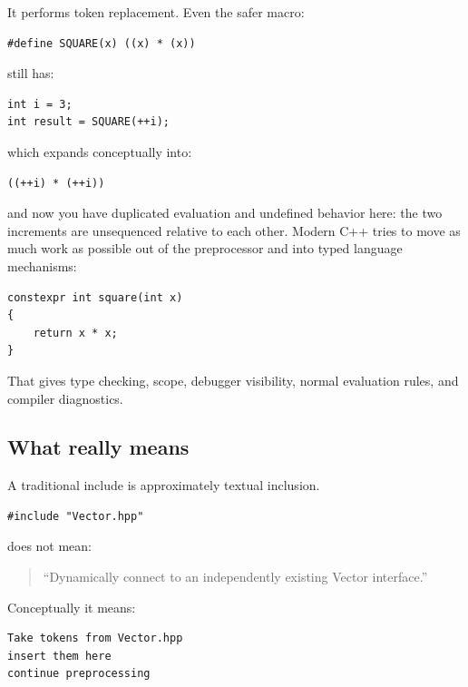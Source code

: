 It performs token replacement. Even the safer macro:

\begin{verbatim}
#define SQUARE(x) ((x) * (x))
\end{verbatim}

still has:

\begin{verbatim}
int i = 3;
int result = SQUARE(++i);
\end{verbatim}

which expands conceptually into:

\begin{verbatim}
((++i) * (++i))
\end{verbatim}

and now you have duplicated evaluation and undefined behavior here: the two increments are unsequenced relative to each other. Modern C++ tries to move as much work as possible out of the preprocessor and into typed language mechanisms:

\begin{verbatim}
constexpr int square(int x)
{
    return x * x;
}
\end{verbatim}

That gives type checking, scope, debugger visibility, normal evaluation rules, and compiler diagnostics.

\subsection{\texorpdfstring{What  really means}{What  really means}}\label{01-foundations-i-ch002-what-include-really-means}

\hypertarget{01-foundations-i-ch002-what-include-really-means}{}

A traditional include is approximately textual inclusion.

\begin{verbatim}
#include "Vector.hpp"
\end{verbatim}

does not mean:

\begin{quote}
``Dynamically connect to an independently existing Vector interface.''
\end{quote}

Conceptually it means:

\begin{verbatim}
Take tokens from Vector.hpp
insert them here
continue preprocessing
\end{verbatim}


